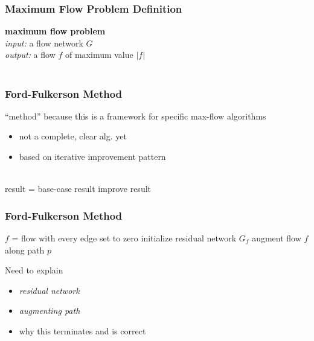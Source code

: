 \documentclass[10pt,aspectratio=169]{beamer}
\newcommand{\stanza}{ \\~\ }
\begin{document}
\begin{frame} \frametitle{Maximum Flow Problem Definition}
\textbf{maximum flow problem} \\
\emph{input:} a flow network $G$ \\
\emph{output:} a flow $f$ of maximum value $|f|$ \stanza
\end{frame}

\begin{frame} \frametitle{Ford-Fulkerson Method}
``method'' because this is a framework for specific max-flow algorithms
\begin{itemize}
  \item not a complete, clear alg. yet
  \item based on iterative improvement pattern \stanza
\end{itemize}

{\footnotesize
\begin{algorithmic}[1]
  \State result = base-case result
    \State improve result
  \EndWhile
  \State {}
  \EndFunction
\end{algorithmic}
}

\end{frame}

\begin{frame} \frametitle{Ford-Fulkerson Method}
{\footnotesize
\begin{algorithmic}[1]
  \State $f$ = flow with every edge set to zero
  \State initialize residual network $G_f$
    \State augment flow $f$ along path $p$
  \EndWhile
  \State {}
  \EndFunction
\end{algorithmic}
}
\vspace{.5cm}

Need to explain
\begin{itemize}
  \item \emph{residual network}
  \item \emph{augmenting path}
  \item why this terminates and is correct
\end{itemize}
\end{frame}
\end{document}
